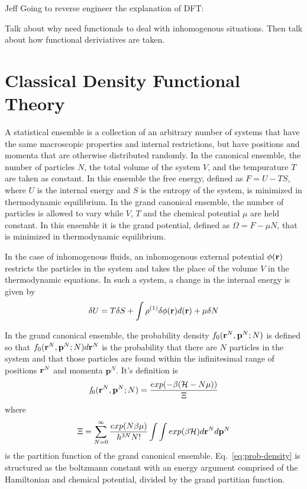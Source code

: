 Jeff Going to reverse engineer the explanation of DFT:

Talk about why need functionals to deal with inhomogenous situations.
Then talk about how functional deriviatives are taken.

\section{Classical Density Functional Theory}

A statistical ensemble is a collection of an arbitrary number of
systems that have the same macroscopic properties and internal
restrictions, but have positions and momenta that are otherwise
distributed randomly.  In the canonical ensemble, the number of
particles $N$, the total volume of the system $V$, and the tempurature
$T$ are taken as constant.  In this ensemble the free energy, defined
as $F = U - TS$, where $U$ is the internal energy and $S$ is the
entropy of the system, is  minimized in thermodynamic equilibrium. In
the grand canonical ensemble, the number of particles is allowed to
vary while $V$, $T$ and the chemical potential $\mu$ are held constant.
In this ensemble it is the grand potential, defined as $\Omega = F -
\mu N$, that is minimized in thermodynamic equilibrium.

In the case of inhomogenous fluids, an inhomogenous external potential
$\phi(\textbf{r})$ restricts the particles in the system and takes the place
of the volume $V$ in the thermodynamic equations.  In such a system, a
change in the internal energy is given by
\begin{align}
  \delta U = T\delta S + \int \rho^{(1)}\delta \phi(\textbf{r})d(\textbf{r}) + \mu \delta N
\end{align}

In the grand canonical ensemble, the probability density
$f_0(\textbf{r}^N,\mathbf{p}^N;N)$ is defined so that
$f_0(\textbf{r}^N,\mathbf{p}^N;N)d\textbf{r}^N$ is the probability that there are
$N$ particles in the system and that those particles are found within
the infinitesimal range of positions $\textbf{r}^N$ and momenta
$\mathbf{p}^N$.  It's definition is
\begin{align} \label{eq:prob-density}
  \mathit{f}_0(\textbf{r}^N,\mathbf{p}^N;N) = \frac{exp(-\beta(\mathcal{H}-N\mu))}{\Xi}
\end{align}
where
\begin{align}
  \Xi = \sum_{N=0}^{\infty}\frac{exp(N\beta\mu)}{h^{3N}N!}\int\int exp(\beta \mathcal{H})d\textbf{r}^Nd\mathbf{p}^N
\end{align}
is the partition function of the grand canonical
ensemble. Eq.~\ref{eq:prob-density} is structured as the boltzmann
constant with an energy argument comprised of the Hamiltonian and
chemical potential, divided by the grand partitian function.

